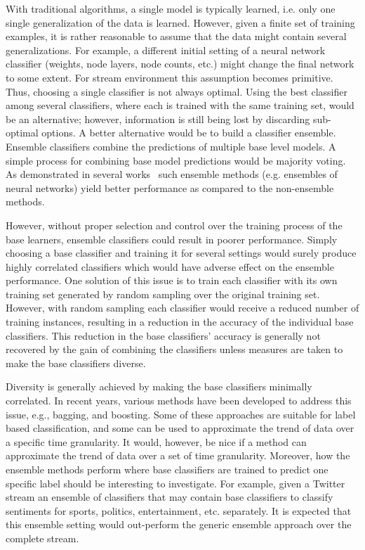 With traditional algorithms, a single model is typically learned, i.e. only one single generalization of the data is learned. However, given a finite set of training examples, it is rather reasonable to assume that the data might contain several generalizations. For example, a different initial setting of a neural network classifier (weights, node layers, node counts, etc.) might change the final network to some extent. For stream environment this assumption becomes primitive. Thus, choosing a single classifier is not always optimal. Using the best classifier among several classifiers, where each is trained with the same training set, would be an alternative; however, information is still being lost by discarding sub-optimal options. A better alternative would be to build a classifier ensemble. Ensemble classifiers combine the predictions of multiple base level models. A simple process for combining base model predictions would be majority voting. As demonstrated in several works~\cite{breiman94:bagging, schapire90:whyens} such ensemble methods (e.g. ensembles of neural networks) yield better performance as compared to the non-ensemble methods.

However, without proper selection and control over the training process of the base learners, ensemble classifiers could result in poorer performance. Simply choosing a base classifier and training it for several settings would surely produce highly correlated classifiers which would have adverse effect on the ensemble performance. One solution of this issue is to train each classifier with its own training set generated by random sampling over the original training set. However, with random sampling each classifier would receive a reduced number of training instances, resulting in a reduction in the accuracy of the individual base classifiers. This reduction in the base classifiers' accuracy is generally not recovered by the gain of combining the classifiers unless measures are taken to make the base classifiers diverse.

Diversity is generally achieved by making the base classifiers minimally correlated. In recent years, various methods have been developed to address this issue, e.g., bagging, and boosting. Some of these approaches are suitable for label based classification, and some can be used to approximate the trend of data over a specific time granularity. It would, however, be nice if a method can approximate the trend of data over a set of time granularity. Moreover, how the ensemble methods perform where base classifiers are trained to predict one specific label should be interesting to investigate. For example, given a Twitter stream an ensemble of classifiers that may contain base classifiers to classify sentiments for sports, politics, entertainment, etc. separately. It is expected that this ensemble setting would out-perform the generic ensemble approach over the complete stream.

